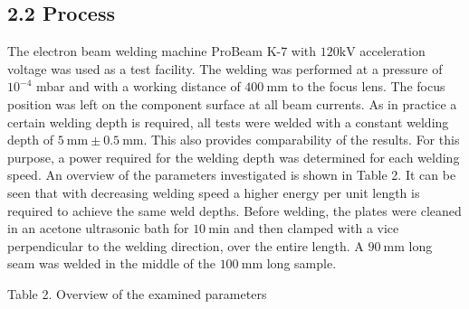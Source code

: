 \documentclass[10pt]{article}
\begin{document}
\subsection*{2.2 Process}
The electron beam welding machine ProBeam K-7 with $120 \mathrm{kV}$ acceleration voltage was used as a test facility. The welding was performed at a pressure of $10^{-4}$ mbar and with a working distance of $400 \mathrm{~mm}$ to the focus lens. The focus position was left on the component surface at all beam currents. As in practice a certain welding depth is required, all tests were welded with a constant welding depth of $5 \mathrm{~mm} \pm 0.5 \mathrm{~mm}$. This also provides comparability of the results. For this purpose, a power required for the welding depth was determined for each welding speed. An overview of the parameters investigated is shown in Table 2. It can be seen that with decreasing welding speed a higher energy per unit length is required to achieve the same weld depths. Before welding, the plates were cleaned in an acetone ultrasonic bath for $10 \mathrm{~min}$ and then clamped with a vice perpendicular to the welding direction, over the entire length. A $90 \mathrm{~mm}$ long seam was welded in the middle of the $100 \mathrm{~mm}$ long sample.

Table 2. Overview of the examined parameters
\end{document}
